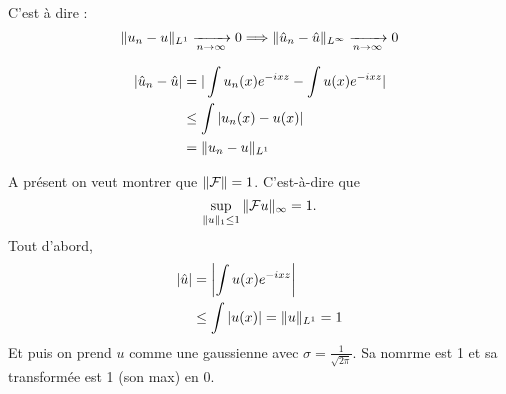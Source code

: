 C'est à dire : $$\| u_n - u \|_{L^1} \xrightarrow[n \to \infty]{} 0 \Longrightarrow
\| \hat u_n - \hat u \|_{L^\infty} \xrightarrow[n \to \infty]{} 0$$

\begin{align}
    | \hat u_n - \hat u |
    &= | \int u_n(x) e^{-ixz} - \int u(x) e^{-ixz} | \\
    &\leq \int |u_n(x) - u(x)| \\
    &= \| u_n - u \|_{L^1}
\end{align}

A présent on veut montrer que $\| \mathcal{F} \| = 1$.
C'est-à-dire que
\[ \sup_{\| u \|_1 \leq 1} \| \mathcal{F}u \|_\infty = 1. \]
%
Tout d'abord,
\begin{align}
    | \hat u | &= \left| \int u(x) e^{-ixz} \right| \\
    &\leq \int |u(x)| = \| u \|_{L^1} = 1
\end{align}
%
Et puis on prend $u$ comme une gaussienne avec
$\sigma = \frac{1}{\sqrt{2 \pi}}$. Sa nomrme est 1 et
sa transformée est 1 (son max) en 0.



